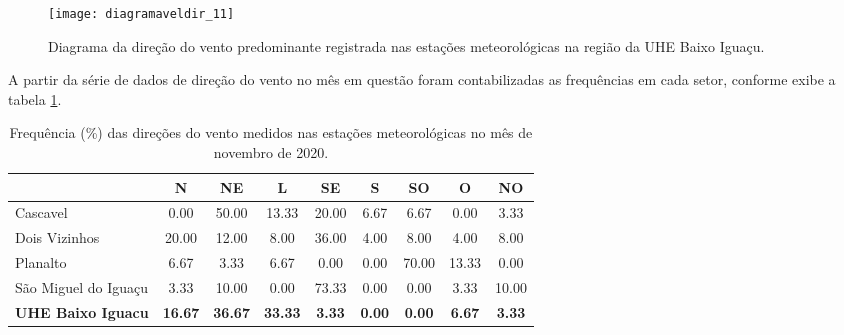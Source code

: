\documentclass[a4paper,12pt]{article}
\begin{document}
    \begin{figure}[!htb]
    \texttt{[image: diagramaveldir\_11]}
    \caption{Diagrama da direção do vento predominante registrada nas estações meteorológicas na região da UHE Baixo Iguaçu.}
    \label{fig:figdir}
    \end{figure}
    
    A partir da série de dados de direção do vento no mês em questão foram contabilizadas as frequências em cada setor, conforme exibe a 
    tabela \ref{tab:tabdir}.

    \begin{table}[!hbt]
    \begin{center}
    \caption{Frequência (\%) das direções do vento medidos nas estações meteorológicas no mês de novembro de 2020.}
    \label{tab:tabdir}
    \begin{tabular}{lcccccccc}
    \hline
             &        N      &        NE     &        L      &        SE     &        S     &        SO     &        O    &        NO  \\
    \hline                                                                                                                            
    Cascavel       &        0.00     &        50.00     &        13.33     &        20.00     &        6.67    &        6.67     &        0.00   &        3.33   \\
    Dois Vizinhos       &        20.00     &        12.00     &        8.00     &        36.00     &        4.00    &        8.00     &        4.00   &        8.00   \\
    Planalto       &        6.67     &        3.33     &        6.67     &        0.00     &        0.00    &        70.00     &        13.33   &        0.00   \\
    São Miguel do Iguaçu       &        3.33     &        10.00     &        0.00     &        73.33     &        0.00    &        0.00     &        3.33   &        10.00   \\
    \textbf{UHE Baixo Iguacu}       &        \textbf{16.67}     &        \textbf{36.67}     &        \textbf{33.33}     &        \textbf{3.33}     &        \textbf{0.00}    &        \textbf{0.00}     &        \textbf{6.67}   &        \textbf{3.33}   \\

    \hline          
    \end{tabular}
    \end{center}
    \end{table}
\end{document}
